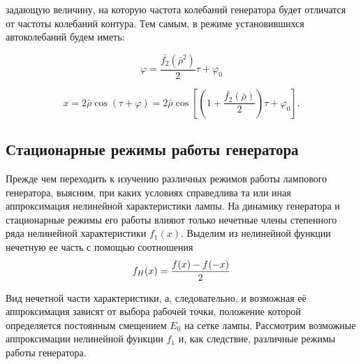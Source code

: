 задающую величину, на которую частота колебаний генератора будет отличатся от частоты колебаний контура. Тем самым, в режиме установившихся автоколебаний будем иметь:

\begin{equation}
\label{eq:14}
\varphi=\frac{\bar{f_2}(\bar{\rho}^2)}{2}\tau+\varphi_0
\end{equation}

\begin{equation}
\label{eq:15}
x=2\bar{\rho}\cos(\tau+\varphi)=2\bar{\rho}\cos[(1+\frac{\bar{f_2}(\bar{\rho})}{2})\tau+\varphi_0].
\end{equation}

\subsection{Стационарные режимы работы генератора}

Прежде чем переходить к изучению различных режимов работы лампового генератора, выясним, при каких условиях справедлива та или иная аппроксимация нелинейной характеристики лампы. На динамику генератора и стационарные режимы его работы влияют только нечетные члены степенного ряда нелинейной характеристики $f_{1}(x)$. Выделим из нелинейной функции нечетную ее часть с помощью соотношения
\begin{equation}
\vspace{0pt}
\label{eq:16}
f_H(x)=\frac{f(x)-f(-x)}{2}
\end{equation}

Вид нечетной части характеристики, а, следовательно, и возможная её аппроксимация зависят от выбора рабочей точки, положение которой определяется постоянным смещением $E_{0}$ на сетке лампы. Рассмотрим возможные аппроксимации нелинейной функции $f_{1}$ и, как следствие, различные режимы работы генератора.

